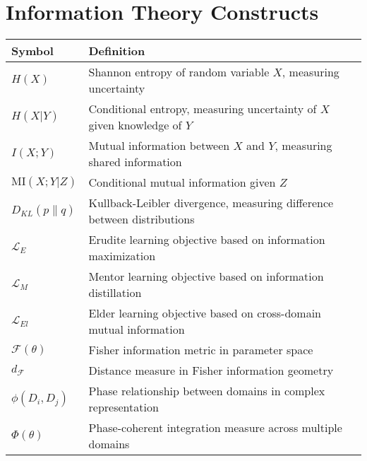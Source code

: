 \section*{Information Theory Constructs}
\begin{center}
\begin{tabular}{>{\centering\arraybackslash}p{3cm} p{10cm}}
\hline
\textbf{Symbol} & \textbf{Definition} \\
\hline
$H(X)$ & Shannon entropy of random variable $X$, measuring uncertainty \\
$H(X|Y)$ & Conditional entropy, measuring uncertainty of $X$ given knowledge of $Y$ \\
$I(X;Y)$ & Mutual information between $X$ and $Y$, measuring shared information \\
$\text{MI}(X;Y|Z)$ & Conditional mutual information given $Z$ \\
$D_{KL}(p \| q)$ & Kullback-Leibler divergence, measuring difference between distributions \\
$\mathcal{L}_E$ & Erudite learning objective based on information maximization \\
$\mathcal{L}_M$ & Mentor learning objective based on information distillation \\
$\mathcal{L}_{El}$ & Elder learning objective based on cross-domain mutual information \\
$\mathcal{F}(\theta)$ & Fisher information metric in parameter space \\
$d_{\mathcal{F}}$ & Distance measure in Fisher information geometry \\
$\phi(D_i, D_j)$ & Phase relationship between domains in complex representation \\
$\Phi(\theta)$ & Phase-coherent integration measure across multiple domains \\
\hline
\end{tabular}
\end{center}

\vspace{0.5cm}


